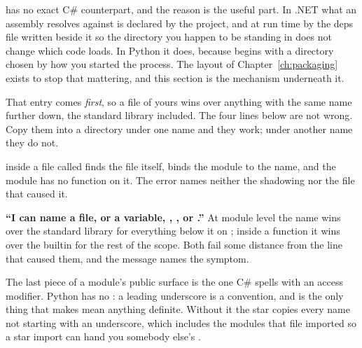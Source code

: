 \begin{csbox}
 has no exact C\# counterpart, and the reason is the useful part.
In .NET what an assembly resolves against is declared \dash{} by the project,
and at run time by the deps file written beside it \dash{} so the directory
you happen to be standing in does not change which code loads. In Python it
does, because  begins with a directory chosen by how you
started the process. The  layout of Chapter~\ref{ch:packaging}
exists to stop that mattering, and this section is the mechanism underneath
it.
\end{csbox}

\noindent
That  entry comes \emph{first}, so a file of yours wins over
anything with the same name further down, the standard library included.
The four lines below are not wrong. Copy them into a directory under one
name and they work; under another name they do not.




\noindent
{} inside a file called  finds the file
itself, binds the module to the name, and the module has no 
function on it. The error names neither the shadowing nor the file that
caused it.

\begin{trapbox}
\textbf{\enquote{I can name a file, or a variable, , ,
 or .}} At module level the name wins over the
standard library for everything below it on ; inside a
function it wins over the builtin for the rest of the scope. Both fail some
distance from the line that caused them, and the message names the symptom.
\end{trapbox}

\noindent
The last piece of a module's public surface is the one C\# spells with an
access modifier. Python has no : a leading underscore is a
convention, and  is the only thing that makes
 mean anything definite. Without it the star
copies every name not starting with an underscore, which includes the
modules that file imported \dash{} so a star import can hand you somebody
else's .

